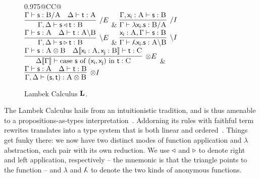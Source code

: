 \begin{figure}
	\centering
	\begin{tabularx}{0.975\textwidth}{@{}CC@{}}
		\\[2em]
		$\infer[\divright E]{\Gamma, \Delta \vdash \term{s}\appright\term{t}: \prop B}{\Gamma \vdash  \term{s}: \prop{B} \divright \prop{A} & \Delta \vdash \term{t}: \prop{A}}$
		& 
		$\infer[\divright I]{\Gamma \vdash \term{\lambda x_i.s}: \prop{B} \divright \prop{A}}{\Gamma, \term{x_i}: \prop A \vdash \term{s}: \prop{B}}$\\[2em]
		$\infer[\divleft E]{\Gamma, \Delta \vdash \term{s}\appleft\term{t}:\prop B}{\Gamma \vdash \term{s}:\prop A & \Delta \vdash \term{t}:\prop{A}\divleft\prop{B}}$
		& 
		$\infer[\divleft I]{\Gamma \vdash \term{\adbmal x_i.s}: \prop A \divleft \prop B}{\term{x_i}: \prop A, \Gamma \vdash \term{s}: \prop B}$\\[2em]
		$\infer[\otimes E]{\Delta\ctx{\Gamma} \vdash \cterm{case \term{s} of \term{(x_i, x_j)} in \term{t}}: \prop C}{
			\Gamma \vdash \term{s}: \prop{A}\otimes\prop{B}
			&
			\Delta\ctx{\term{x_i}: \prop A, \term{x_j}: \prop{B}}  \vdash \term{t}: \prop C}$
		&
		$\infer[\otimes I]{\Gamma,\Delta \vdash \term{(s,t)}: \prop A \otimes \prop B}{\Gamma \vdash \term{s}: \prop A & \Delta \vdash \term{t}: \prop B}$\\[2em]
	\end{tabularx}
	\caption{Lambek Calculus $\textbf{L}$.}
	\label{figure:lambek_calculus_rules}
\end{figure}

The Lambek Calculus hails from an intuitionistic tradition, and is thus amenable to a propositions-as-types interpretation~\cite{wansing1990formulas}.
Addorning its rules with faithful term rewrites translates into a type system that is both linear and ordered~\cite{pierce2004advanced}.
Things get funky there: we now have two distinct modes of function application and $\lambda$ abstraction, each pair with its own reduction.
We use $\triangleleft$ and $\triangleright$ to denote right and left application, respectively -- the mnemonic is that the triangle points to the function -- and $\lambda$ and $\adbmal$ to denote the two kinds of anonymous functions.

